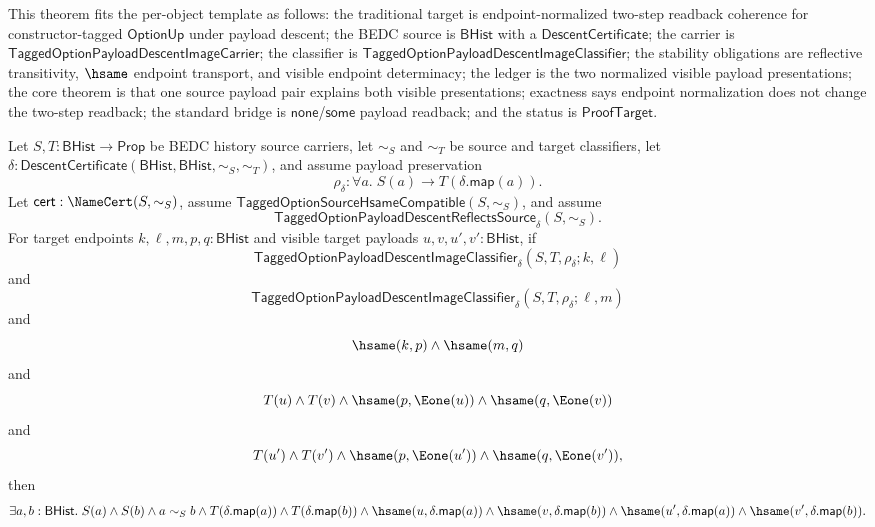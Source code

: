 
\begin{theorem}
\label{thm:tagged-option-payload-descent-image-classifier-reflective-transitive-transported-visible-pair-coherence}
This theorem fits the per-object template as follows: the traditional target is
endpoint-normalized two-step readback coherence for constructor-tagged
$\mathsf{OptionUp}$ under payload descent; the BEDC source is $\mathsf{BHist}$
with a $\mathsf{DescentCertificate}$; the carrier is
$\mathsf{TaggedOptionPayloadDescentImageCarrier}$; the classifier is
$\mathsf{TaggedOptionPayloadDescentImageClassifier}$; the stability obligations
are reflective transitivity, $\hsame$ endpoint transport, and visible endpoint
determinacy; the ledger is the two normalized visible payload presentations; the
core theorem is that one source payload pair explains both visible
presentations; exactness says endpoint normalization does not change the
two-step readback; the standard bridge is $\mathsf{none}$/$\mathsf{some}$
payload readback; and the status is $\mathsf{ProofTarget}$.

Let $S,T:\mathsf{BHist}\to\mathsf{Prop}$ be BEDC history source carriers, let
$\sim_S$ and $\sim_T$ be source and target classifiers, let
$\delta:\mathsf{DescentCertificate}(\mathsf{BHist},\mathsf{BHist},\sim_S,\sim_T)$,
and assume payload preservation
$$
\rho_{\delta}:\forall a.\;S(a)\to T(\delta.\mathsf{map}(a)).
$$
Let $\mathsf{cert}:\NameCert(S,\sim_S)$, assume
$\mathsf{TaggedOptionSourceHsameCompatible}(S,\sim_S)$, and assume
$$
\mathsf{TaggedOptionPayloadDescentReflectsSource}_{\delta}(S,\sim_S).
$$
For target endpoints $k,\ell,m,p,q:\mathsf{BHist}$ and visible target payloads
$u,v,u',v':\mathsf{BHist}$, if
$$
\mathsf{TaggedOptionPayloadDescentImageClassifier}_{\delta}
(S,T,\rho_{\delta};k,\ell)
$$
and
$$
\mathsf{TaggedOptionPayloadDescentImageClassifier}_{\delta}
(S,T,\rho_{\delta};\ell,m)
$$
and
$$
\hsame(k,p)\land \hsame(m,q)
$$
and
$$
T(u)\land T(v)\land
\hsame(p,\Eone(u))\land
\hsame(q,\Eone(v))
$$
and
$$
T(u')\land T(v')\land
\hsame(p,\Eone(u'))\land
\hsame(q,\Eone(v')),
$$
then
$$
\exists a,b:\mathsf{BHist}.\;
S(a)\land S(b)\land a\sim_S b\land
T(\delta.\mathsf{map}(a))\land T(\delta.\mathsf{map}(b))\land
\hsame(u,\delta.\mathsf{map}(a))\land
\hsame(v,\delta.\mathsf{map}(b))\land
\hsame(u',\delta.\mathsf{map}(a))\land
\hsame(v',\delta.\mathsf{map}(b)).
$$
\end{theorem}
